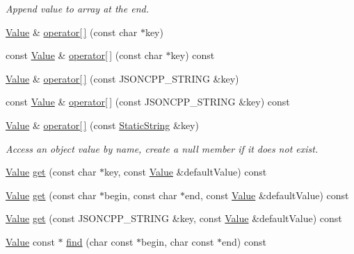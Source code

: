 \begin{DoxyCompactItemize}
\begin{DoxyCompactList}\small\item\em Append value to array at the end. \end{DoxyCompactList}\item 
\hyperlink{classJson_1_1Value}{Value} \& \hyperlink{classJson_1_1Value_acb912f4ec40a25ea6eb387730885f3d9}{operator\mbox{[}$\,$\mbox{]}} (const char $\ast$key)
\item 
const \hyperlink{classJson_1_1Value}{Value} \& \hyperlink{classJson_1_1Value_a1b0498b7b2a520a68137f682d91abdd5}{operator\mbox{[}$\,$\mbox{]}} (const char $\ast$key) const
\item 
\hyperlink{classJson_1_1Value}{Value} \& \hyperlink{classJson_1_1Value_aedd1e152756a4cc8c1ebac0dd7aeeb78}{operator\mbox{[}$\,$\mbox{]}} (const J\+S\+O\+N\+C\+P\+P\+\_\+\+S\+T\+R\+I\+NG \&key)
\item 
const \hyperlink{classJson_1_1Value}{Value} \& \hyperlink{classJson_1_1Value_aba60f69dcd85e935aa85e7a517e03427}{operator\mbox{[}$\,$\mbox{]}} (const J\+S\+O\+N\+C\+P\+P\+\_\+\+S\+T\+R\+I\+NG \&key) const
\item 
\hyperlink{classJson_1_1Value}{Value} \& \hyperlink{classJson_1_1Value_ac3763d7d315ca65dc188e273722f7955}{operator\mbox{[}$\,$\mbox{]}} (const \hyperlink{classJson_1_1StaticString}{Static\+String} \&key)
\begin{DoxyCompactList}\small\item\em Access an object value by name, create a null member if it does not exist. \end{DoxyCompactList}\item 
\hyperlink{classJson_1_1Value}{Value} \hyperlink{classJson_1_1Value_a57de86629ed23246f14014fb6c44fa67}{get} (const char $\ast$key, const \hyperlink{classJson_1_1Value}{Value} \&default\+Value) const
\item 
\hyperlink{classJson_1_1Value}{Value} \hyperlink{classJson_1_1Value_aa59ed050e87e1d58d93671a38687f36c}{get} (const char $\ast$begin, const char $\ast$end, const \hyperlink{classJson_1_1Value}{Value} \&default\+Value) const
\item 
\hyperlink{classJson_1_1Value}{Value} \hyperlink{classJson_1_1Value_a7406e6af727c288bf8ab59945ece686a}{get} (const J\+S\+O\+N\+C\+P\+P\+\_\+\+S\+T\+R\+I\+NG \&key, const \hyperlink{classJson_1_1Value}{Value} \&default\+Value) const
\item 
\hyperlink{classJson_1_1Value}{Value} const  $\ast$ \hyperlink{classJson_1_1Value_afb007b9ce9b2cf9d5f667a07e5e0349f}{find} (char const $\ast$begin, char const $\ast$end) const

\end{DoxyCompactItemize}
